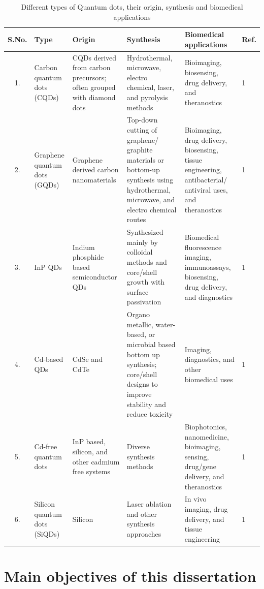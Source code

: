 \begin{refsection}
\begin{table}[htbp]
	\centering
	\caption{Different types of Quantum dots, their origin, synthesis and biomedical applications}
	\label{sheet:QD}
	\small
	\renewcommand{\arraystretch}{1.15}
	\begin{tabularx}{\textwidth}{|c|>{\raggedright\arraybackslash}X|>{\raggedright\arraybackslash}X|>{\raggedright\arraybackslash}X|>{\raggedright\arraybackslash}X|p{0.8cm}|}
		\hline
		\textbf{S.No.} & \textbf{Type} & \textbf{Origin} & \textbf{Synthesis} & \textbf{Biomedical applications} & \textbf{Ref.} \\
		\hline
		1. & Carbon quantum dots (CQDs) & CQDs derived from carbon precursors; often grouped with diamond dots & Hydrothermal, microwave, electro chemical, laser, and pyrolysis methods & Bioimaging, biosensing, drug delivery, and theranostics & 1 \\
		\hline
		2. & Graphene quantum dots (GQDs) & Graphene derived carbon nanomaterials & Top-down cutting of graphene/ graphite materials or bottom-up synthesis using hydrothermal, microwave, and electro chemical routes & Bioimaging, drug delivery, biosensing, tissue engineering, antibacterial/ antiviral uses, and theranostics & 1 \\
		\hline
		3. & InP QDs & Indium phosphide based semiconductor QDs & Synthesized mainly by colloidal methods and core/shell growth with surface passivation & Biomedical fluorescence imaging, immunoassays, biosensing, drug delivery, and diagnostics & 1 \\
		\hline
		4. & Cd-based QDs & CdSe and CdTe & Organo metallic, water-based, or microbial based bottom up synthesis; core/shell designs to improve stability and reduce toxicity & Imaging, diagnostics, and other biomedical uses & 1\\
		\hline
		5. & Cd-free quantum dots & InP based, silicon, and other cadmium free systems & Diverse synthesis methods & Biophotonics, nanomedicine, bioimaging, sensing, drug/gene delivery, and theranostics &1\\
		\hline
		6. & Silicon quantum dots (SiQDs) & Silicon & Laser ablation and other synthesis approaches & In vivo imaging, drug delivery, and tissue engineering & 1\\
		\hline
	\end{tabularx}
\end{table}





\section{Main objectives of this dissertation}


\end{refsection}
